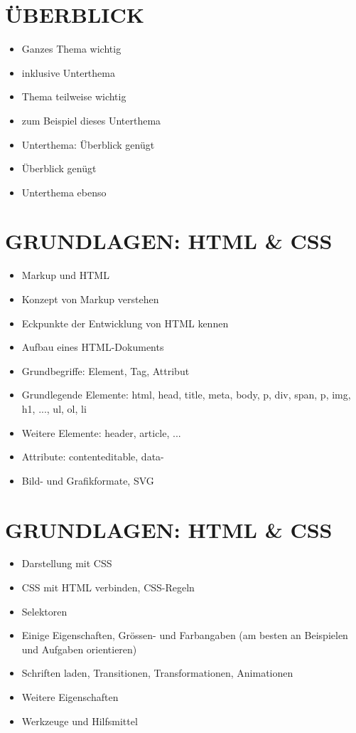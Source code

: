 \section*{ÜBERBLICK}
\begin{itemize}
  \item Ganzes Thema wichtig
  \item inklusive Unterthema
  \item Thema teilweise wichtig
  \item zum Beispiel dieses Unterthema
  \item Unterthema: Überblick genügt
  \item Überblick genügt
  \item Unterthema ebenso
\end{itemize}

\section*{GRUNDLAGEN: HTML \& CSS}
\begin{itemize}
  \item Markup und HTML
  \item Konzept von Markup verstehen
  \item Eckpunkte der Entwicklung von HTML kennen
  \item Aufbau eines HTML-Dokuments
  \item Grundbegriffe: Element, Tag, Attribut
  \item Grundlegende Elemente: html, head, title, meta, body, p, div, span, p, img, h1, ..., ul, ol, li
  \item Weitere Elemente: header, article, ...
  \item Attribute: contenteditable, data-
  \item Bild- und Grafikformate, SVG
\end{itemize}

\section*{GRUNDLAGEN: HTML \& CSS}
\begin{itemize}
  \item Darstellung mit CSS
  \item CSS mit HTML verbinden, CSS-Regeln
  \item Selektoren
  \item Einige Eigenschaften, Grössen- und Farbangaben (am besten an Beispielen und Aufgaben orientieren)
  \item Schriften laden, Transitionen, Transformationen, Animationen
  \item Weitere Eigenschaften
  \item Werkzeuge und Hilfsmittel
\end{itemize}

